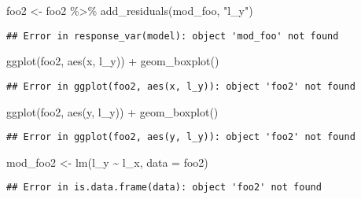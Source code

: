 \documentclass[
]{article}
\newenvironment{Shaded}{\begin{snugshade}}{\end{snugshade}}
\newcommand{\AttributeTok}[1]{\textcolor[rgb]{0.77,0.63,0.00}{#1}}
\newcommand{\FunctionTok}[1]{\textcolor[rgb]{0.00,0.00,0.00}{#1}}
\newcommand{\NormalTok}[1]{#1}
\newcommand{\OtherTok}[1]{\textcolor[rgb]{0.56,0.35,0.01}{#1}}
\newcommand{\SpecialCharTok}[1]{\textcolor[rgb]{0.00,0.00,0.00}{#1}}
\newcommand{\StringTok}[1]{\textcolor[rgb]{0.31,0.60,0.02}{#1}}
\begin{document}
\begin{Shaded}
\begin{Highlighting}[]
\NormalTok{foo2 }\OtherTok{\textless{}{-}}\NormalTok{ foo2 }\SpecialCharTok{\%\textgreater{}\%} 
  \FunctionTok{add\_residuals}\NormalTok{(mod\_foo, }\StringTok{"l\_y"}\NormalTok{)}
\end{Highlighting}
\end{Shaded}

\begin{verbatim}
## Error in response_var(model): object 'mod_foo' not found
\end{verbatim}

\begin{Shaded}
\begin{Highlighting}[]
\FunctionTok{ggplot}\NormalTok{(foo2, }\FunctionTok{aes}\NormalTok{(x, l\_y)) }\SpecialCharTok{+} \FunctionTok{geom\_boxplot}\NormalTok{()}
\end{Highlighting}
\end{Shaded}

\begin{verbatim}
## Error in ggplot(foo2, aes(x, l_y)): object 'foo2' not found
\end{verbatim}

\begin{Shaded}
\begin{Highlighting}[]
\FunctionTok{ggplot}\NormalTok{(foo2, }\FunctionTok{aes}\NormalTok{(y, l\_y)) }\SpecialCharTok{+} \FunctionTok{geom\_boxplot}\NormalTok{()}
\end{Highlighting}
\end{Shaded}

\begin{verbatim}
## Error in ggplot(foo2, aes(y, l_y)): object 'foo2' not found
\end{verbatim}

\begin{Shaded}
\begin{Highlighting}[]
\NormalTok{mod\_foo2 }\OtherTok{\textless{}{-}} \FunctionTok{lm}\NormalTok{(l\_y }\SpecialCharTok{\textasciitilde{}}\NormalTok{ l\_x, }\AttributeTok{data =}\NormalTok{ foo2)}
\end{Highlighting}
\end{Shaded}

\begin{verbatim}
## Error in is.data.frame(data): object 'foo2' not found
\end{verbatim}
\end{document}
